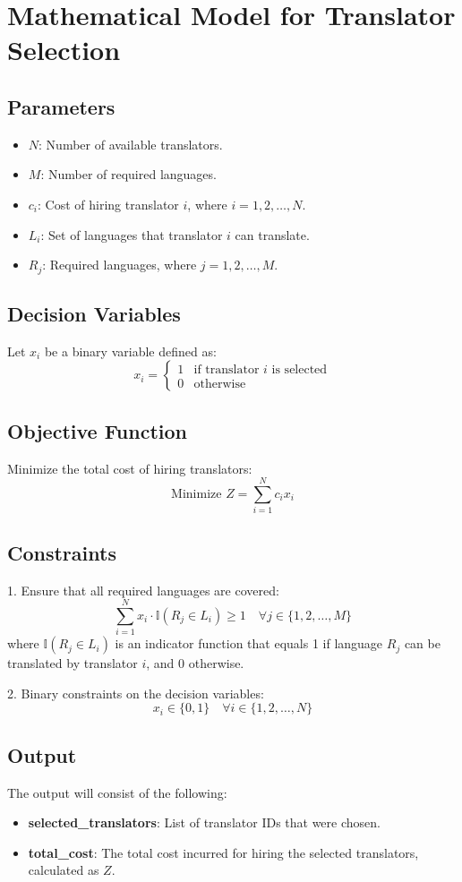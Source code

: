 \documentclass{article}
\begin{document}
\section*{Mathematical Model for Translator Selection}

\subsection*{Parameters}
\begin{itemize}
    \item $N$: Number of available translators.
    \item $M$: Number of required languages.
    \item $c_i$: Cost of hiring translator $i$, where $i = 1, 2, \ldots, N$.
    \item $L_i$: Set of languages that translator $i$ can translate.
    \item $R_j$: Required languages, where $j = 1, 2, \ldots, M$.
\end{itemize}

\subsection*{Decision Variables}
Let $x_i$ be a binary variable defined as:
\[
x_i = 
\begin{cases} 
1 & \text{if translator } i \text{ is selected} \\
0 & \text{otherwise} 
\end{cases}
\]

\subsection*{Objective Function}
Minimize the total cost of hiring translators:
\[
\text{Minimize } Z = \sum_{i=1}^{N} c_i x_i
\]

\subsection*{Constraints}
1. Ensure that all required languages are covered:
\[
\sum_{i=1}^{N} x_i \cdot \mathbb{I}(R_j \in L_i) \geq 1 \quad \forall j \in \{1, 2, \ldots, M\}
\]
where $\mathbb{I}(R_j \in L_i)$ is an indicator function that equals 1 if language $R_j$ can be translated by translator $i$, and 0 otherwise.

2. Binary constraints on the decision variables:
\[
x_i \in \{0, 1\} \quad \forall i \in \{1, 2, \ldots, N\}
\]

\subsection*{Output}
The output will consist of the following:
\begin{itemize}
    \item \textbf{selected\_translators}: List of translator IDs that were chosen.
    \item \textbf{total\_cost}: The total cost incurred for hiring the selected translators, calculated as $Z$.
\end{itemize}
\end{document}

